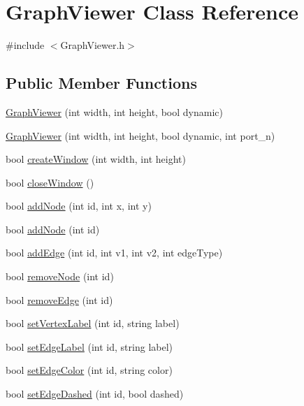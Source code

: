 \hypertarget{class_graph_viewer}{}\section{Graph\+Viewer Class Reference}
\label{class_graph_viewer}


{\ttfamily \#include $<$Graph\+Viewer.\+h$>$}

\subsection*{Public Member Functions}
\begin{DoxyCompactItemize}
\item 
\hyperlink{class_graph_viewer_a8adc614f4fc290a3efcec7d7ceb1c58a}{Graph\+Viewer} (int width, int height, bool dynamic)
\item 
\hyperlink{class_graph_viewer_ad9d7b1d8b4ba8ef18517eae0e68568a2}{Graph\+Viewer} (int width, int height, bool dynamic, int port\+\_\+n)
\item 
bool \hyperlink{class_graph_viewer_ae5247dc66449dcd21fc5d531bbbaddfa}{create\+Window} (int width, int height)
\item 
bool \hyperlink{class_graph_viewer_a85990c1eaac7feed3950960d4bd2fd4c}{close\+Window} ()
\item 
bool \hyperlink{class_graph_viewer_a5421e86ac76433876309236ba96e70a2}{add\+Node} (int id, int x, int y)
\item 
bool \hyperlink{class_graph_viewer_ab9be856eb5f45284719a3bb119ec01ea}{add\+Node} (int id)
\item 
bool \hyperlink{class_graph_viewer_aad0c1448c37f744209ffb671f1bd0015}{add\+Edge} (int id, int v1, int v2, int edge\+Type)
\item 
bool \hyperlink{class_graph_viewer_a0c418639bb911eb827cabf895915f775}{remove\+Node} (int id)
\item 
bool \hyperlink{class_graph_viewer_a9a8ee68c7c12b373affbe4069dd95d72}{remove\+Edge} (int id)
\item 
bool \hyperlink{class_graph_viewer_ac25d7d007022fda16799808ba136e909}{set\+Vertex\+Label} (int id, string label)
\item 
bool \hyperlink{class_graph_viewer_a447cca0064e785654c2105602c2961ca}{set\+Edge\+Label} (int id, string label)
\item 
bool \hyperlink{class_graph_viewer_a07ccc96707efae4aa5f3ced3dca015af}{set\+Edge\+Color} (int id, string color)
\item 
bool \hyperlink{class_graph_viewer_a1698f1c6b3a8e7cabc7b7d7cf42fc7f0}{set\+Edge\+Dashed} (int id, bool dashed)

\end{DoxyCompactItemize}
